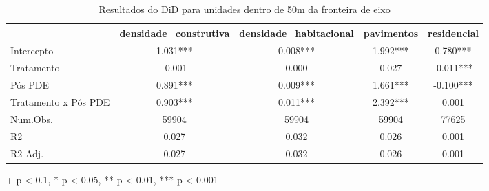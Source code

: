 \begin{table}[!t]
\caption{\label{tab:analise/did-IPTU}Resultados do DiD para unidades dentro de 50m da fronteira de eixo} 
\fontsize{12.0pt}{14.4pt}\selectfont
\begin{tabular*}{\linewidth}{@{\extracolsep{\fill}}lcccc}
\toprule
  & densidade\_construtiva & densidade\_habitacional & pavimentos & residencial \\ 
\midrule\addlinespace[2.5pt]
Intercepto & 1.031*** & 0.008*** & 1.992*** & 0.780*** \\ 
Tratamento & -0.001 & 0.000 & 0.027 & -0.011*** \\ 
Pós PDE & 0.891*** & 0.009*** & 1.661*** & -0.100*** \\ 
{Tratamento x Pós PDE} & {0.903***} & {0.011***} & {2.392***} & {0.001} \\ 
Num.Obs. & 59904 & 59904 & 59904 & 77625 \\ 
R2 & 0.027 & 0.032 & 0.026 & 0.001 \\ 
R2 Adj. & 0.027 & 0.032 & 0.026 & 0.001 \\ 
\bottomrule
\end{tabular*}
\begin{minipage}{\linewidth}
+ p < 0.1, * p < 0.05, ** p < 0.01, *** p < 0.001\\
\end{minipage}
\end{table}

